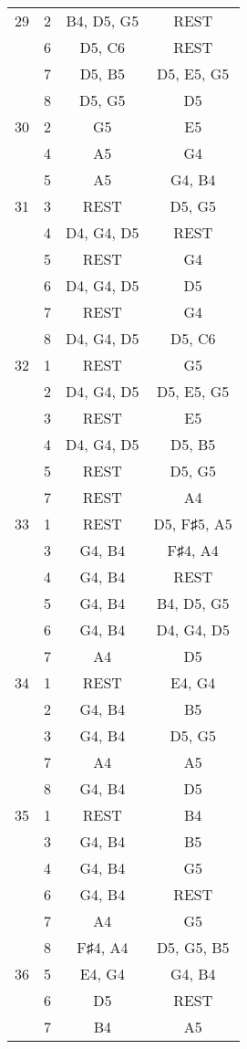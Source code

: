 \documentclass{article}
\begin{document}
\begin{longtable}{|c|c|c|c|}
\hline
29 & 2 & B4, D5, G5 & REST \\ 
  & 6 & D5, C6 & REST \\ 
  & 7 & D5, B5 & D5, E5, G5 \\ 
  & 8 & D5, G5 & D5 \\ 
\hline
30 & 2 & G5 & E5 \\ 
  & 4 & A5 & G4 \\ 
  & 5 & A5 & G4, B4 \\ 
\hline
31 & 3 & REST & D5, G5 \\ 
  & 4 & D4, G4, D5 & REST \\ 
  & 5 & REST & G4 \\ 
  & 6 & D4, G4, D5 & D5 \\ 
  & 7 & REST & G4 \\ 
  & 8 & D4, G4, D5 & D5, C6 \\ 
\hline
32 & 1 & REST & G5 \\ 
  & 2 & D4, G4, D5 & D5, E5, G5 \\ 
  & 3 & REST & E5 \\ 
  & 4 & D4, G4, D5 & D5, B5 \\ 
  & 5 & REST & D5, G5 \\ 
  & 7 & REST & A4 \\ 
\hline
33 & 1 & REST & D5, F♯5, A5 \\ 
  & 3 & G4, B4 & F♯4, A4 \\ 
  & 4 & G4, B4 & REST \\ 
  & 5 & G4, B4 & B4, D5, G5 \\ 
  & 6 & G4, B4 & D4, G4, D5 \\ 
  & 7 & A4 & D5 \\ 
\hline
34 & 1 & REST & E4, G4 \\ 
  & 2 & G4, B4 & B5 \\ 
  & 3 & G4, B4 & D5, G5 \\ 
  & 7 & A4 & A5 \\ 
  & 8 & G4, B4 & D5 \\ 
\hline
35 & 1 & REST & B4 \\ 
  & 3 & G4, B4 & B5 \\ 
  & 4 & G4, B4 & G5 \\ 
  & 6 & G4, B4 & REST \\ 
  & 7 & A4 & G5 \\ 
  & 8 & F♯4, A4 & D5, G5, B5 \\ 
\hline
36 & 5 & E4, G4 & G4, B4 \\ 
  & 6 & D5 & REST \\ 
  & 7 & B4 & A5 \\ 

\end{longtable}
\end{document}
